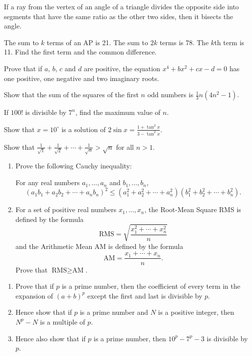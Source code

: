 \begin{problems}
    If a ray from the vertex of an angle of a triangle divides the opposite
    side into segments that have the same ratio as the other two sides, then it
    bisects the angle.

    \problem The sum to $k$ terms of an AP is 21. The sum to $2k$ terms is 78.
    The $k$th term is 11. Find the first term and the common difference. 
    
    \problem Prove that if $a$, $b$, $c$ and $d$ are positive, the equation
    $x^4 + bx^2 + cx - d = 0$ has one positive, one negative and two imaginary
    roots. 
    
    \problem Show that the sum of the squares of the first $n$ odd numbers is
    $\frac{1}{3}n(4n^2 - 1)$. 
    
    \problem If $100!$ is divisible by $7^{n}$, find the maximum value of $n$. 
    
    \problem Show that $x = 10^\circ$ is a solution of $2\sin x=\frac{1 +
    \tan^2x}{3 - \tan^2x}$. 
    
    \problem Show that $\frac{1}{\sqrt{1}} + \frac{1}{\sqrt{2}} + \cdots +
    \frac{1}{\sqrt{n}} > \sqrt{n}$ for all $n > 1$. 
    
    \problem 
    \begin{enumerate}
        \item Prove the following Cauchy inequality:
            \par For any real numbers $a_1, \ldots, a_n$ and $b_1, \ldots, b_n$,
            \[(a_{1}b_{1} + a_{2}b_{2} + \cdots +a_{n}b_{n})^2\leq (a_{1}^2 +
            a_{2}^2 + \cdots + a_{n}^2)(b_{1}^2 + b_{2}^2 + \cdots +
            b_{n}^2).\]
        
        \item For a set of positive real numbers $x_1, \ldots, x_n$, the
            Root-Mean Square RMS is defined by the formula 
            \[\text{RMS} = \sqrt{\frac{x_{1}^2 + \cdots + x_{n}^2}{n}}\] 
            and the Arithmetic Mean AM is defined by the formula 
            \[\text{AM} = \frac{x_{1} + \cdots + x_{n}}{n}.\] 
            Prove that $\text{RMS} \geq \text{AM}$.
    \end{enumerate}
    
    \problem 
    \begin{enumerate}
        \item Prove that if $p$ is a prime number, then the coefficient of
            every term in the expansion of $(a + b)^p$ except the first and
            last is divisible by $p$. 
        
        \item Hence show that if $p$ is a prime number and $N$ is a positive
            integer, then $N^{p} - N$ is a multiple of $p$. 
        
        \item Hence also show that if $p$ is a prime number, then $10^p - 7^p -
            3$ is divisible by $p$. 
    \end{enumerate}
\end{problems}
